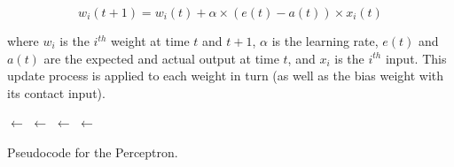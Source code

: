 \begin{equation}
	w_{i}(t+1) = w_{i}(t) + \alpha \times (e(t)-a(t)) \times x_{i}(t)
\end{equation}

where $w_i$ is the $i^{th}$ weight at time $t$ and $t+1$, $\alpha$ is the learning rate, $e(t)$ and $a(t)$ are the expected and actual output at time $t$, and $x_i$ is the $i^{th}$ input. This update process is applied to each weight in turn (as well as the bias weight with its contact input).

\begin{algorithm}[ht]
	\SetLine  


	
	\KwIn{\ProblemSize, \InputPatterns, \MaxIterations, \LearningRate}		
	\KwOut{\Weights}
  
	\Weights $\leftarrow$ \InitializeWeights{\ProblemSize}\;
	 {
		\Pattern $\leftarrow$ \SelectInputPattern{\InputPatterns}\;
		\Activation $\leftarrow$ \ActivateNetwork{\Pattern, \Weights}\;
		\Output $\leftarrow$ \TransferActivation{\Activation}\;
		\UpdateWeights{\Pattern, \Output, \LearningRate}\;
	}
	\Return{\Weights}\;
	\caption{Pseudocode for the Perceptron.}
	\label{alg:train}
\end{algorithm}

